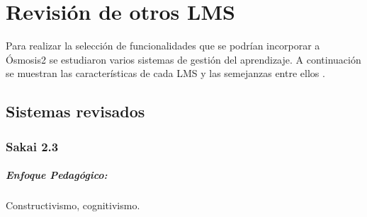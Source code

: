 \chapter{Revisión de otros LMS}
Para realizar la selección de funcionalidades que se podrían incorporar a Ósmosis2 se estudiaron varios sistemas de gestión del aprendizaje. A continuación se muestran las características de cada LMS y las semejanzas entre ellos \label{Comparativa de LMS} \citep{EduTools}.
\section{Sistemas revisados}
\subsection{Sakai 2.3 }
	\paragraph{Enfoque Pedagógico:} Constructivismo, cognitivismo.
